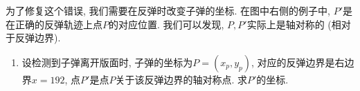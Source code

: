 \begin{enumerate}
        为了修复这个错误, 我们需要在反弹时改变子弹的坐标.
        在图中右侧的例子中, $P'$是在正确的反弹轨迹上点$P$的对应位置.
        我们可以发现, $P,P'$实际上是轴对称的 (相对于反弹边界).

        \begin{enumerate}[label=(\alph*),start=2]
          \item 设检测到子弹离开版面时,
                子弹的坐标为$P = (x_p,y_p)$,
                对应的反弹边界是右边界$x = 192$,
                点$P'$是点$P$关于该反弹边界的轴对称点.
                求$P'$的坐标.
        \end{enumerate}
\end{enumerate}
